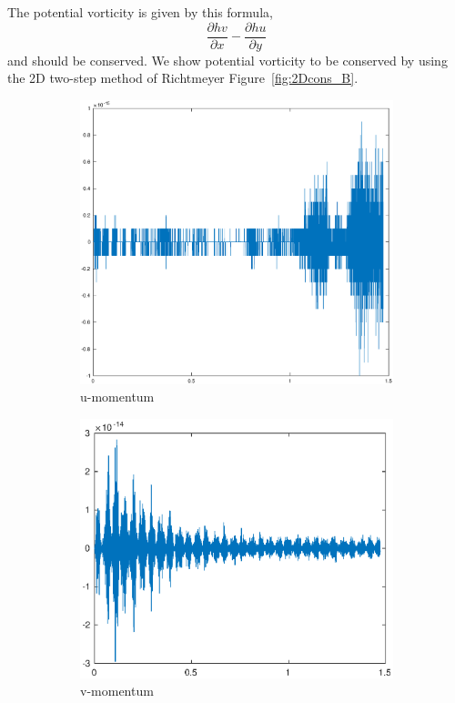 The potential vorticity is given by this formula,
\begin{equation}\label{eqn:13}
\frac{\partial hv}{\partial x} - \frac{\partial hu}{\partial y} 
\end{equation}
and should be conserved. We show potential vorticity to be conserved by using the 2D two-step method
of Richtmeyer Figure~\ref{fig:2Dcons_B}.
\newline

\begin{figure}[h!]
    \centering
    \begin{subfigure}[b]{0.9\textwidth}
        \centering
        \includegraphics[width=1.1\textwidth,height=0.52\textwidth]{images/cons_momu.eps}\hfill
        \caption{u-momentum}
        \label{fig:Energy}
    \end{subfigure}
    \hfill
    \begin{subfigure}[b]{0.9\textwidth}
        \centering
        \includegraphics[width=1.1\textwidth, height=0.52\textwidth]{images/cons_momv.eps}\hfill
        \caption{v-momentum}
        \label{fig:Mass}
    \end{subfigure}
    \hfill
    \begin{subfigure}[b]{0.9\textwidth}

\end{subfigure}
\end{figure}
